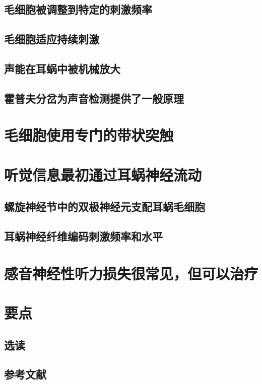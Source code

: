 \subsection{毛细胞被调整到特定的刺激频率}
\subsection{毛细胞适应持续刺激}
\subsection{声能在耳蜗中被机械放大}
\subsection{霍普夫分岔为声音检测提供了一般原理}

\section{毛细胞使用专门的带状突触}

\section{听觉信息最初通过耳蜗神经流动}
\subsection{螺旋神经节中的双极神经元支配耳蜗毛细胞}
\subsection{耳蜗神经纤维编码刺激频率和水平}

\section{感音神经性听力损失很常见，但可以治疗}

\section{要点}
\subsection{选读}
\subsection{参考文献}